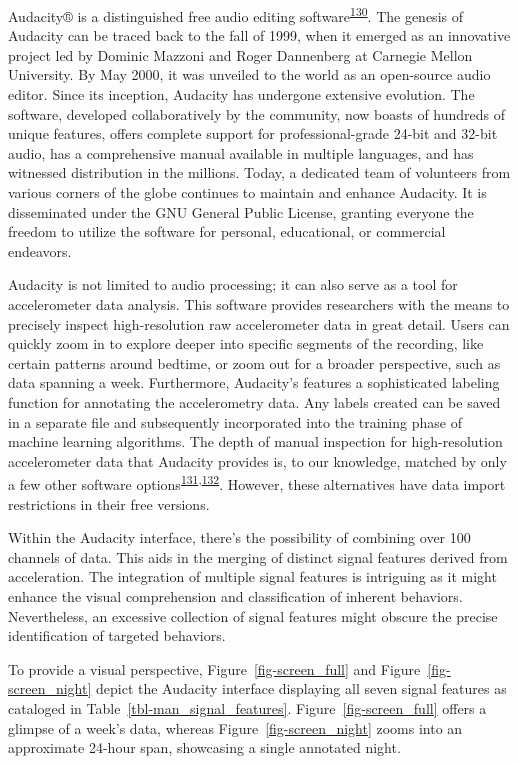 \documentclass[
  10pt,
]{scrbook}
\begin{document}
Audacity®️ is a distinguished free audio editing
software\textsuperscript{\protect\hyperlink{ref-audacity}{130}}. The
genesis of Audacity can be traced back to the fall of 1999, when it
emerged as an innovative project led by Dominic Mazzoni and Roger
Dannenberg at Carnegie Mellon University. By May 2000, it was unveiled
to the world as an open-source audio editor. Since its inception,
Audacity has undergone extensive evolution. The software, developed
collaboratively by the community, now boasts of hundreds of unique
features, offers complete support for professional-grade 24-bit and
32-bit audio, has a comprehensive manual available in multiple
languages, and has witnessed distribution in the millions. Today, a
dedicated team of volunteers from various corners of the globe continues
to maintain and enhance Audacity. It is disseminated under the GNU
General Public License, granting everyone the freedom to utilize the
software for personal, educational, or commercial endeavors.

Audacity is not limited to audio processing; it can also serve as a tool
for accelerometer data analysis. This software provides researchers with
the means to precisely inspect high-resolution raw accelerometer data in
great detail. Users can quickly zoom in to explore deeper into specific
segments of the recording, like certain patterns around bedtime, or zoom
out for a broader perspective, such as data spanning a week.
Furthermore, Audacity's features a sophisticated labeling function for
annotating the accelerometry data. Any labels created can be saved in a
separate file and subsequently incorporated into the training phase of
machine learning algorithms. The depth of manual inspection for
high-resolution accelerometer data that Audacity provides is, to our
knowledge, matched by only a few other software
options\textsuperscript{\protect\hyperlink{ref-visplore}{131},\protect\hyperlink{ref-label_studio}{132}}.
However, these alternatives have data import restrictions in their free
versions.

Within the Audacity interface, there's the possibility of combining over
100 channels of data. This aids in the merging of distinct signal
features derived from acceleration. The integration of multiple signal
features is intriguing as it might enhance the visual comprehension and
classification of inherent behaviors. Nevertheless, an excessive
collection of signal features might obscure the precise identification
of targeted behaviors.

To provide a visual perspective, Figure~\ref{fig-screen_full} and
Figure~\ref{fig-screen_night} depict the Audacity interface displaying
all seven signal features as cataloged in
Table~\ref{tbl-man_signal_features}. Figure~\ref{fig-screen_full} offers
a glimpse of a week's data, whereas Figure~\ref{fig-screen_night} zooms
into an approximate 24-hour span, showcasing a single annotated night.
\end{document}
